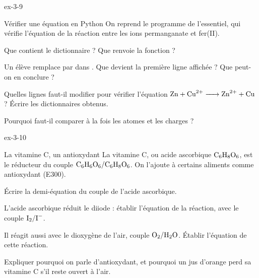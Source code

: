 \begin{blocLivre}{ex-3-9}
\begin{exercice}[2]{Vérifier une équation en Python}
On reprend le programme de l'essentiel, qui vérifie l'équation de la réaction entre les ions permanganate et fer(II).
\begin{questions}
\item {}Que contient le dictionnaire  ? Que renvoie la fonction  ?
\item Un élève remplace  par  dans . Que devient la première ligne affichée ? Que peut-on en
conclure ?
\item Quelles lignes faut-il modifier pour vérifier l'équation $\ce{Zn + Cu^{2+} -> Zn^{2+} + Cu}$ ? Écrire les dictionnaires obtenus.
\item Pourquoi faut-il comparer à la fois les atomes et les charges ?
\end{questions}
\end{exercice}
\end{blocLivre}
\begin{blocLivre}{ex-3-10}
\begin{exercice}[2]{La vitamine C, un antioxydant}
La vitamine C, ou acide ascorbique $\ce{C6H8O6}$, est le réducteur du couple $\ce{C6H6O6}/\ce{C6H8O6}$. On l'ajoute à certains aliments
comme antioxydant (E300).
\begin{questions}
\item Écrire la demi-équation du couple de l'acide ascorbique.
\item L'acide ascorbique réduit le diiode : établir l'équation de la réaction, avec le couple $\ce{I2}/\ce{I-}$.
\item Il réagit aussi avec le dioxygène de l'air, couple $\ce{O2}/\ce{H2O}$. Établir l'équation de cette réaction.
\item Expliquer pourquoi on parle d'antioxydant, et pourquoi un jus d'orange perd sa vitamine C s'il reste ouvert à l'air.
\end{questions}
\end{exercice}
\end{blocLivre}
